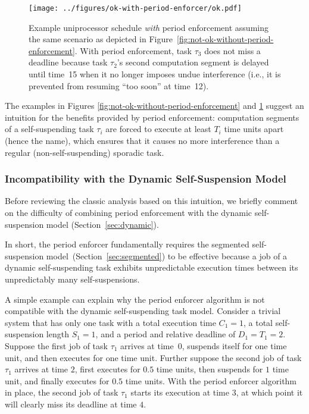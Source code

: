 \begin{figure}[t]
  \centering
  \texttt{[image: ../figures/ok-with-period-enforcer/ok.pdf]}
  \caption{Example uniprocessor schedule \emph{with} period enforcement assuming the same scenario as depicted in Figure~\ref{fig:not-ok-without-period-enforcement}. With period enforcement, task $\tau_3$ does not miss a deadline because task $\tau_2$'s second computation segment is delayed until time~15 when it no longer imposes undue interference (i.e., it is prevented from resuming ``too soon'' at time~12).}
  \label{fig:ok-with-period-enforcement}
\end{figure}

The examples in Figures \ref{fig:not-ok-without-period-enforcement} and \ref{fig:ok-with-period-enforcement} suggest an intuition for the benefits provided by period enforcement: computation segments of a self-suspending task $\tau_i$ are forced to execute at least $T_i$ time units apart (hence the name), which ensures that it causes no more interference than a regular (non-self-suspending) sporadic task.


\subsubsection{Incompatibility with the Dynamic Self-Suspension Model}
\label{sec:incompat}

Before reviewing the classic analysis based on this intuition, we briefly comment on the difficulty of combining period enforcement with the dynamic self-suspension model (Section~\ref{sec:dynamic}).

In short, the period enforcer fundamentally requires the segmented self-suspension model~(Section~\ref{sec:segmented}) to be effective because a job of a dynamic self-suspending task exhibits unpredictable execution times between its unpredictably many self-suspensions. 

A simple example can explain why the period enforcer algorithm is not compatible with the dynamic self-suspending task model. Consider a trivial system that has only one task with a total execution time $C_1=1$, a total self-suspension length $S_1=1$, and a period and relative deadline of $D_1=T_1=2$. Suppose the first job of task $\tau_1$ arrives at time~$0$, suspends itself for one time unit, and then executes for one time unit. Further suppose the second job of task $\tau_1$ arrives at time $2$, first executes for $0.5$ time units, then suspends for $1$ time unit, and finally executes for $0.5$ time units. With the period enforcer algorithm in place, the second job of task $\tau_1$ starts its execution at time $3$, at which point it will clearly miss its deadline at time $4$.

